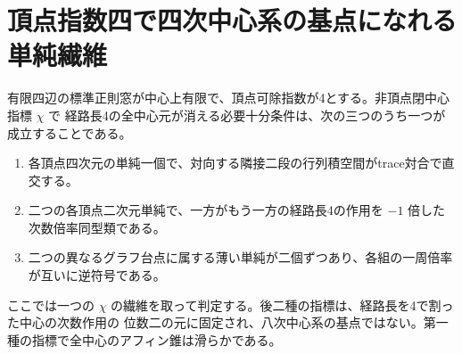 \section{頂点指数四で四次中心系の基点になれる単純繊維}
\label{sec:index-four-quartic-basepoints}
\begin{theorem}\label{thm:index-four-quartic-basepoints}
有限四辺の標準正則窓が中心上有限で、頂点可除指数が4とする。非頂点閉中心指標 $\chi$ で
経路長4の全中心元が消える必要十分条件は、次の三つのうち一つが成立することである。
\begin{enumerate}
\item 各頂点四次元の単純一個で、対向する隣接二段の行列積空間がtrace対合で直交する。
\item 二つの各頂点二次元単純で、一方がもう一方の経路長4の作用を $-1$ 倍した次数倍率同型類である。
\item 二つの異なるグラフ台点に属する薄い単純が二個ずつあり、各組の一周倍率が互いに逆符号である。
\end{enumerate}
ここでは一つの $\chi$ の繊維を取って判定する。後二種の指標は、経路長を4で割った中心の次数作用の
位数二の元に固定され、八次中心系の基点ではない。第一種の指標で全中心のアフィン錐は滑らかである。
\end{theorem}
